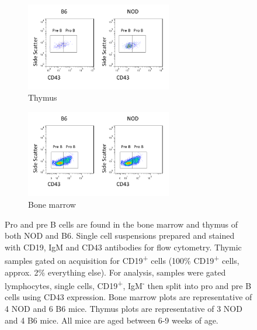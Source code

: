 

\begin{figure}	
	\begin{subfigure}{\textwidth}
	\centering
	\includegraphics[width=0.7\textwidth]{Figures/Thymuspropre.png}
	\caption{Thymus}
	\label{subfig:Thypropre}
	\end{subfigure}
	\begin{subfigure}{\textwidth}
	\centering
	\includegraphics[width=0.7\textwidth]{Figures/Bonemarrowpropre.png}
	\caption{Bone marrow}
	\label{subfig:BMpropre}
	\end{subfigure}
\caption[Pro and pre B cells are present in NOD and B6 thymi]{Pro and pre B cells are found in the bone marrow and thymus of both NOD and B6. Single cell suspensions prepared and stained with CD19, IgM and CD43 antibodies for flow cytometry. Thymic samples gated on acquisition for CD19\textsuperscript{+} cells (100\% CD19\textsuperscript{+} cells, approx. 2\% everything else). For analysis, samples were gated lymphocytes, single cells, CD19\textsuperscript{+}, IgM\textsuperscript{-} then split into pro and pre B cells using CD43 expression. Bone marrow plots are representative of 4 NOD and 6 B6 mice. Thymus plots are representative of 3 NOD and 4 B6 mice. All mice are aged between 6-9 weeks of age.}
\label{fig:PropreBcells}
\end{figure}





